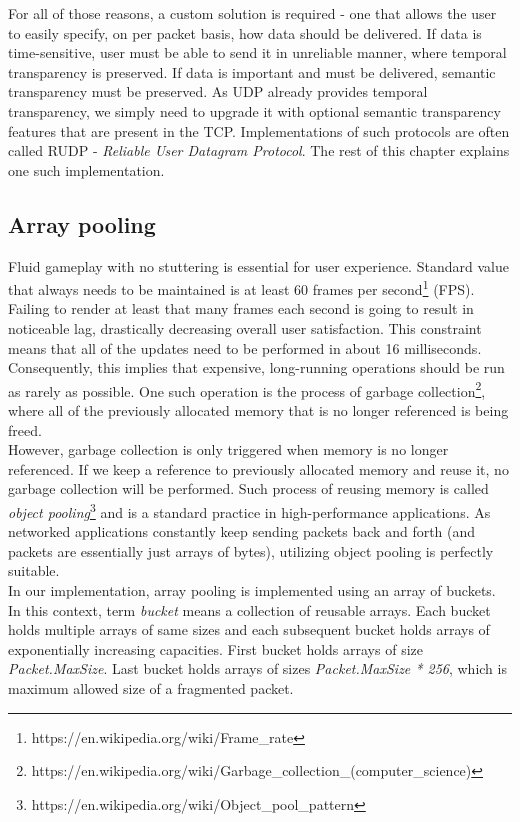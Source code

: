 \documentclass[times, utf8, diplomski]{fer}
\begin{document}
For all of those reasons, a custom solution is required - one that allows the user to easily specify, on per packet basis, how data should be delivered. If data is time-sensitive, user must be able to send it in unreliable manner, where temporal transparency is preserved. If data is important and must be delivered, semantic transparency must be preserved. As UDP already provides temporal transparency, we simply need to upgrade it with optional semantic transparency features that are present in the TCP. Implementations of such protocols are often called RUDP - \textit{Reliable User Datagram Protocol}. The rest of this chapter explains one such implementation.

\subsection{Array pooling}
Fluid gameplay with no stuttering is essential for user experience. Standard value that always needs to be maintained is at least 60 frames per second\footnote{https://en.wikipedia.org/wiki/Frame\_rate} (FPS). Failing to render at least that many frames each second is going to result in noticeable lag, drastically decreasing overall user satisfaction. This constraint means that all of the updates need to be performed in about 16 milliseconds. Consequently, this implies that expensive, long-running operations should be run as rarely as possible. One such operation is the process of garbage collection\footnote{https://en.wikipedia.org/wiki/Garbage\_collection\_(computer\_science)}, where all of the previously allocated memory that is no longer referenced is being freed.\\

However, garbage collection is only triggered when memory is no longer referenced. If we keep a reference to previously allocated memory and reuse it, no garbage collection will be performed. Such process of reusing memory is called \textit{object pooling}\footnote{https://en.wikipedia.org/wiki/Object\_pool\_pattern} and is a standard practice in high-performance applications. As networked applications constantly keep sending packets back and forth (and packets are essentially just arrays of bytes), utilizing object pooling is perfectly suitable.\\

In our implementation, array pooling is implemented using an array of buckets. In this context, term \textit{bucket} means a collection of reusable arrays. Each bucket holds multiple arrays of same sizes and each subsequent bucket holds arrays of exponentially increasing capacities. First bucket holds arrays of size \textit{Packet.MaxSize}. Last bucket holds arrays of sizes \textit{Packet.MaxSize * 256}, which is maximum allowed size of a fragmented packet.
\end{document}
